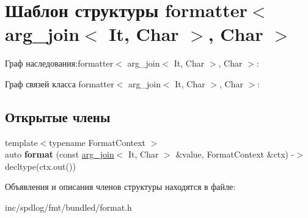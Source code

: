 \hypertarget{structformatter_3_01arg__join_3_01It_00_01Char_01_4_00_01Char_01_4}{}\section{Шаблон структуры formatter$<$ arg\+\_\+join$<$ It, Char $>$, Char $>$}
\label{structformatter_3_01arg__join_3_01It_00_01Char_01_4_00_01Char_01_4}


Граф наследования\+:formatter$<$ arg\+\_\+join$<$ It, Char $>$, Char $>$\+:


Граф связей класса formatter$<$ arg\+\_\+join$<$ It, Char $>$, Char $>$\+:
\subsection*{Открытые члены}
\begin{DoxyCompactItemize}
\item 
\mbox{\label{structformatter_3_01arg__join_3_01It_00_01Char_01_4_00_01Char_01_4_ae0c4a217ef67f0a573d1c4fd9bfe0472}} 
{\footnotesize template$<$typename Format\+Context $>$ }\\auto {\bfseries format} (const \hyperlink{structarg__join}{arg\+\_\+join}$<$ It, Char $>$ \&value, Format\+Context \&ctx) -\/$>$ decltype(ctx.\+out())
\end{DoxyCompactItemize}


Объявления и описания членов структуры находятся в файле\+:\begin{DoxyCompactItemize}
\item 
inc/spdlog/fmt/bundled/format.\+h\end{DoxyCompactItemize}
